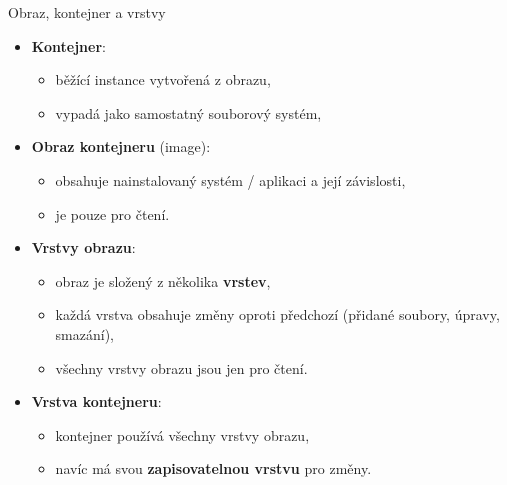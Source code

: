\documentclass{beamer}
\begin{document}
\begin{frame}{Obraz, kontejner a vrstvy}
	\begin{itemize}
		\item \textbf{Kontejner}:
		\begin{itemize}
			\item běžící instance vytvořená z obrazu,
			\item vypadá jako samostatný souborový systém,
		\end{itemize}

		\item \textbf{Obraz kontejneru} (image):
		\begin{itemize}
			\item obsahuje nainstalovaný systém / aplikaci a její závislosti,
			\item je pouze pro čtení.
		\end{itemize}


		
		\item \textbf{Vrstvy obrazu}:
		\begin{itemize}
			\item obraz je složený z několika \textbf{vrstev},
			\item každá vrstva obsahuje změny oproti předchozí
			(přidané soubory, úpravy, smazání),
			\item všechny vrstvy obrazu jsou jen pro čtení.
		\end{itemize}
		
		\item \textbf{Vrstva kontejneru}:
		\begin{itemize}
			\item kontejner používá všechny vrstvy obrazu,
			\item navíc má svou \textbf{zapisovatelnou vrstvu} pro změny.
		\end{itemize}
		

	\end{itemize}
\end{frame}
\end{document}
